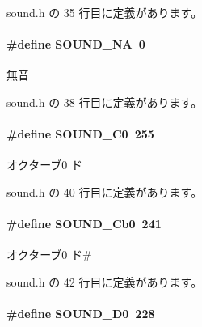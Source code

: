  sound.\+h の 35 行目に定義があります。

\paragraph[{S\+O\+U\+N\+D\+\_\+\+N\+A}]{\setlength{\rightskip}{0pt plus 5cm}\#define S\+O\+U\+N\+D\+\_\+\+N\+A~0}\label{sound_8h_a00e51ccb7bab9d21f8cd5611028ca051_a00e51ccb7bab9d21f8cd5611028ca051}


無音 



 sound.\+h の 38 行目に定義があります。

\paragraph[{S\+O\+U\+N\+D\+\_\+\+C0}]{\setlength{\rightskip}{0pt plus 5cm}\#define S\+O\+U\+N\+D\+\_\+\+C0~255}\label{sound_8h_a7a8291aa331919d505eb896f5f23b84c_a7a8291aa331919d505eb896f5f23b84c}


オクターブ0 ド 



 sound.\+h の 40 行目に定義があります。

\paragraph[{S\+O\+U\+N\+D\+\_\+\+Cb0}]{\setlength{\rightskip}{0pt plus 5cm}\#define S\+O\+U\+N\+D\+\_\+\+Cb0~241}\label{sound_8h_a5cf7b47c621b7f44cb936a18e7a227be_a5cf7b47c621b7f44cb936a18e7a227be}


オクターブ0 ド\# 



 sound.\+h の 42 行目に定義があります。

\paragraph[{S\+O\+U\+N\+D\+\_\+\+D0}]{\setlength{\rightskip}{0pt plus 5cm}\#define S\+O\+U\+N\+D\+\_\+\+D0~228}\label{sound_8h_a78855daec2050679bd8ef984b6474384_a78855daec2050679bd8ef984b6474384}



